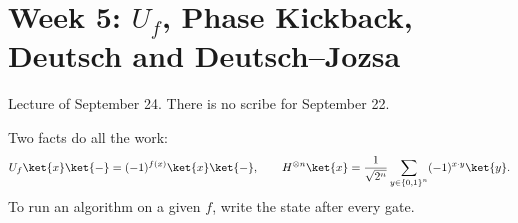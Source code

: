 \section{Week 5: $U_f$, Phase Kickback, Deutsch and Deutsch--Jozsa}\label{sec:week5}

Lecture of September 24. There is no scribe for September 22.

\begin{opentable}
\end{opentable}

Two facts do all the work:
\[U_f \ket{x}\ket{-} = (-1)^{f(x)} \ket{x}\ket{-},
    \qquad
    H^{\otimes n}\ket{x} = \frac{1}{\sqrt{2^n}} \sum_{y \in \set{0,1}^n} (-1)^{x \cdot y} \ket{y}.\]
To run an algorithm on a given $f$, write the state after every gate.

